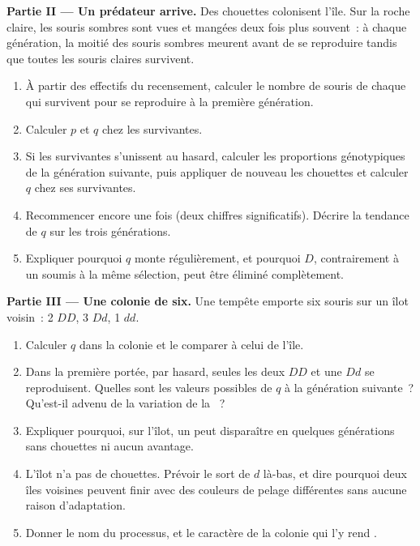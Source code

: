 \begin{problem}
\medskip
\noindent\textbf{Partie II --- Un prédateur arrive.}
Des chouettes colonisent l'île. Sur la roche claire, les souris sombres
sont vues et mangées deux fois plus souvent~: à chaque génération, la
moitié des souris sombres meurent avant de se reproduire tandis que
toutes les souris claires survivent.
\begin{enumerate}[resume]
  \item À partir des effectifs du recensement, calculer le nombre de
        souris de chaque  qui survivent pour se reproduire à la
        première génération.
  \item Calculer $p$ et $q$ chez les survivantes.
  \item Si les survivantes s'unissent au hasard, calculer les
        proportions génotypiques de la génération suivante, puis
        appliquer de nouveau les chouettes et calculer $q$ chez ses
        survivantes.
  \item Recommencer encore une fois (deux chiffres significatifs).
        Décrire la tendance de $q$ sur les trois générations.
  \item Expliquer pourquoi $q$ monte régulièrement, et pourquoi $D$,
        contrairement à un   soumis à la même sélection,
        peut être éliminé complètement.
\end{enumerate}

\medskip
\noindent\textbf{Partie III --- Une colonie de six.}
Une tempête emporte six souris sur un îlot voisin~: 2 $DD$, 3 $Dd$, 1 $dd$.
\begin{enumerate}[resume]
  \item Calculer $q$ dans la colonie et le comparer à celui de l'île.
  \item Dans la première portée, par hasard, seules les deux $DD$ et
        une $Dd$ se reproduisent. Quelles sont les valeurs possibles de
        $q$ à la génération suivante~? Qu'est-il advenu de la variation
        de la ~?
  \item Expliquer pourquoi, sur l'îlot, un  peut disparaître en
        quelques générations sans chouettes ni aucun avantage.
  \item L'îlot n'a pas de chouettes. Prévoir le sort de $d$ là-bas, et
        dire pourquoi deux îles voisines peuvent finir avec des
        couleurs de pelage différentes sans aucune raison d'adaptation.
  \item Donner le nom du processus, et le caractère de la colonie qui
        l'y rend .
\end{enumerate}


\end{problem}
